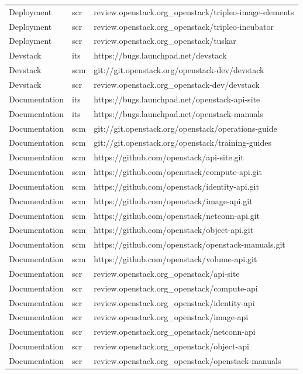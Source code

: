 \documentclass[a4wide,11pt]{report}
\begin{document}
\begin{center}
\begin{longtable}{|p{4cm}|p{1cm}|p{10cm}|}
Deployment&scr&review.openstack.org\_openstack/tripleo-image-elements\\ 
Deployment&scr&review.openstack.org\_openstack/tripleo-incubator\\ 
Deployment&scr&review.openstack.org\_openstack/tuskar\\ 
Devstack&its&https://bugs.launchpad.net/devstack\\ 
Devstack&scm&git://git.openstack.org/openstack-dev/devstack\\ 
Devstack&scr&review.openstack.org\_openstack-dev/devstack\\ 
Documentation&its&https://bugs.launchpad.net/openstack-api-site\\ 
Documentation&its&https://bugs.launchpad.net/openstack-manuals\\ 
Documentation&scm&git://git.openstack.org/openstack/operations-guide\\ 
Documentation&scm&git://git.openstack.org/openstack/training-guides\\ 
Documentation&scm&https://github.com/openstack/api-site.git\\ 
Documentation&scm&https://github.com/openstack/compute-api.git\\ 
Documentation&scm&https://github.com/openstack/identity-api.git\\ 
Documentation&scm&https://github.com/openstack/image-api.git\\ 
Documentation&scm&https://github.com/openstack/netconn-api.git\\ 
Documentation&scm&https://github.com/openstack/object-api.git\\ 
Documentation&scm&https://github.com/openstack/openstack-manuals.git\\ 
Documentation&scm&https://github.com/openstack/volume-api.git\\ 
Documentation&scr&review.openstack.org\_openstack/api-site\\ 
Documentation&scr&review.openstack.org\_openstack/compute-api\\ 
Documentation&scr&review.openstack.org\_openstack/identity-api\\ 
Documentation&scr&review.openstack.org\_openstack/image-api\\ 
Documentation&scr&review.openstack.org\_openstack/netconn-api\\ 
Documentation&scr&review.openstack.org\_openstack/object-api\\ 
Documentation&scr&review.openstack.org\_openstack/openstack-manuals\\ 

\end{longtable}
\end{center}
\end{document}
